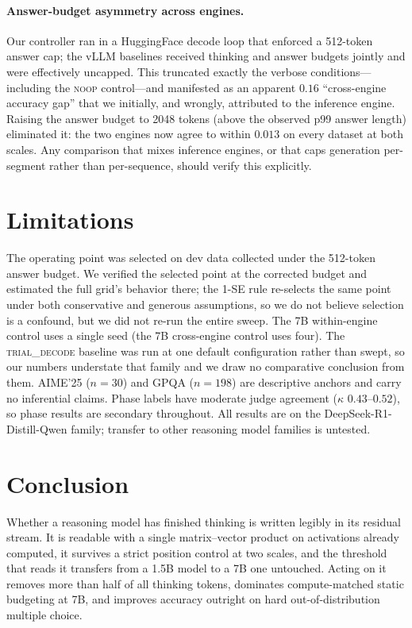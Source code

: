 \paragraph{Answer-budget asymmetry across engines.} Our controller ran in a
HuggingFace decode loop that enforced a 512-token answer cap; the vLLM
baselines received thinking and answer budgets jointly and were effectively
uncapped. This truncated exactly the verbose conditions---including the
\textsc{noop} control---and manifested as an apparent $0.16$ ``cross-engine
accuracy gap'' that we initially, and wrongly, attributed to the inference
engine. Raising the answer budget to 2048 tokens (above the observed p99
answer length) eliminated it: the two engines now agree to within $0.013$ on
every dataset at both scales. Any comparison that mixes inference engines, or
that caps generation per-segment rather than per-sequence, should verify this
explicitly.

\section{Limitations}

The operating point was selected on dev data collected under the 512-token
answer budget. We verified the selected point at the corrected budget and
estimated the full grid's behavior there; the 1-SE rule re-selects the same
point under both conservative and generous assumptions, so we do not believe
selection is a confound, but we did not re-run the entire sweep. The 7B
within-engine control uses a single seed (the 7B cross-engine control uses
four). The \textsc{trial\_decode} baseline was run at one default
configuration rather than swept, so our numbers understate that family and we
draw no comparative conclusion from them. AIME'25 ($n{=}30$) and GPQA ($n{=}198$) are descriptive anchors and
carry no inferential claims. Phase labels have moderate judge agreement
($\kappa$ $0.43$--$0.52$), so phase results are secondary throughout. All
results are on the DeepSeek-R1-Distill-Qwen family; transfer to other reasoning
model families is untested.

\section{Conclusion}

Whether a reasoning model has finished thinking is written legibly in its
residual stream. It is readable with a single matrix--vector product on
activations already computed, it survives a strict position control at two
scales, and the threshold that reads it transfers from a 1.5B model to a 7B
one untouched. Acting on it removes more than half of all thinking tokens,
dominates compute-matched static budgeting at 7B, and improves accuracy
outright on hard out-of-distribution multiple choice.

